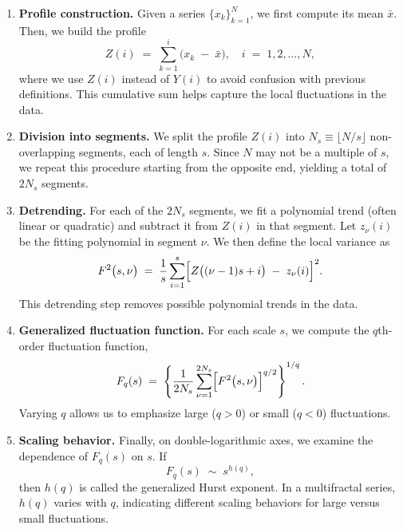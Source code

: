 \documentclass[11pt]{extarticle}
\begin{document}
\begin{enumerate}
    \item \textbf{Profile construction.} Given a series \(\{x_k\}_{k=1}^N\), we first compute its mean \(\bar{x}\). Then, we build the profile
    \begin{equation}
        Z(i) \;=\; \sum_{k=1}^{i} \bigl(x_k \;-\; \bar{x}\bigr), \quad i \;=\; 1,2,\dots,N,
    \end{equation}
    where we use \(Z(i)\) instead of \(Y(i)\) to avoid confusion with previous definitions. This cumulative sum helps capture the local fluctuations in the data.

    \item \textbf{Division into segments.} We split the profile \(Z(i)\) into \(N_s \equiv \lfloor N/s \rfloor\) non-overlapping segments, each of length \(s\). Since \(N\) may not be a multiple of \(s\), we repeat this procedure starting from the opposite end, yielding a total of \(2N_s\) segments.

    \item \textbf{Detrending.} For each of the \(2N_s\) segments, we fit a polynomial trend (often linear or quadratic) and subtract it from \(Z(i)\) in that segment. Let \(z_\nu(i)\) be the fitting polynomial in segment \(\nu\). We then define the local variance as
    \begin{equation}
        F^2\bigl(s,\nu\bigr)
        \;=\;
        \frac{1}{s} \sum_{i=1}^s \Bigl[ Z\bigl((\nu-1)s + i\bigr) \;-\; z_\nu(i) \Bigr]^2.
    \end{equation}
    This detrending step removes possible polynomial trends in the data.

    \item \textbf{Generalized fluctuation function.} For each scale \(s\), we compute the \(q\)th-order fluctuation function,
    \begin{equation}
        F_q(s)
        \;=\;
        \left\{
          \frac{1}{2N_s} \sum_{\nu=1}^{2N_s} \Bigl[ F^2\bigl(s,\nu\bigr) \Bigr]^{q/2}
        \right\}^{1/q}.
    \end{equation}
    Varying \(q\) allows us to emphasize large (\(q>0\)) or small (\(q<0\)) fluctuations.

    \item \textbf{Scaling behavior.} Finally, on double-logarithmic axes, we examine the dependence of \(F_q(s)\) on \(s\). If
    \begin{equation}
        F_q(s) \;\sim\; s^{h(q)},
    \end{equation}
    then \(h(q)\) is called the generalized Hurst exponent. In a multifractal series, \(h(q)\) varies with \(q\),
    indicating different scaling behaviors for large versus small fluctuations.
\end{enumerate}
\end{document}
